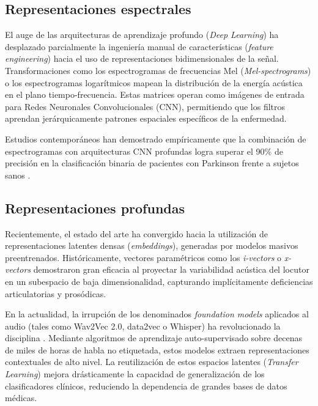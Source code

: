 \subsection{Representaciones espectrales}

El auge de las arquitecturas de aprendizaje profundo (\textit{Deep Learning}) ha desplazado parcialmente la ingeniería manual de características (\textit{feature engineering}) hacia el uso de representaciones bidimensionales de la señal. Transformaciones como los espectrogramas de frecuencias Mel (\textit{Mel-spectrograms}) o los espectrogramas logarítmicos mapean la distribución de la energía acústica en el plano tiempo-frecuencia. Estas matrices operan como imágenes de entrada para Redes Neuronales Convolucionales (CNN), permitiendo que los filtros aprendan jerárquicamente patrones espaciales específicos de la enfermedad. 

Estudios contemporáneos han demostrado empíricamente que la combinación de espectrogramas con arquitecturas CNN profundas logra superar el 90\% de precisión en la clasificación binaria de pacientes con Parkinson frente a sujetos sanos \cite{worasawate2021, alvarez2022}.

\subsection{Representaciones profundas}

Recientemente, el estado del arte ha convergido hacia la utilización de representaciones latentes densas (\textit{embeddings}), generadas por modelos masivos preentrenados. Históricamente, vectores paramétricos como los \textit{i-vectors} o \textit{x-vectors} \cite{moro-velazquezUsingXVectorsAutomatically2020, moro-velazquezNewToolsDifferential2021} demostraron gran eficacia al proyectar la variabilidad acústica del locutor en un subespacio de baja dimensionalidad, capturando implícitamente deficiencias articulatorias y prosódicas.

En la actualidad, la irrupción de los denominados \textit{foundation models} aplicados al audio (tales como Wav2Vec 2.0, data2vec o Whisper) ha revolucionado la disciplina \cite{agbavorArtificialIntelligenceEnabledEndToEnd2023,daoDetectionEarlyParkinsons2025}. Mediante algoritmos de aprendizaje auto-supervisado sobre decenas de miles de horas de habla no etiquetada, estos modelos extraen representaciones contextuales de alto nivel. La reutilización de estos espacios latentes (\textit{Transfer Learning}) mejora drásticamente la capacidad de generalización de los clasificadores clínicos, reduciendo la dependencia de grandes bases de datos médicas.

